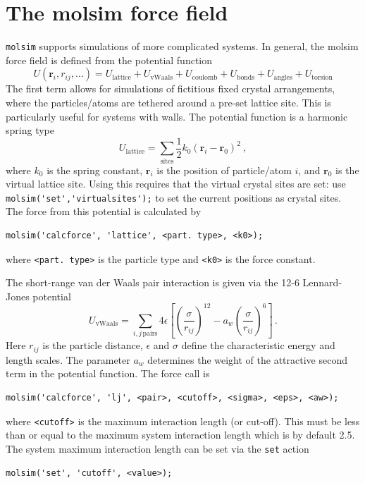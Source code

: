 \documentclass[11pt]{article}
\begin{document}
\section{The \textsf{molsim} force field}
\verb!molsim! supports simulations of more complicated systems. In general, the
\textsf{molsim} force field is defined from the potential function
\begin{equation}
  U(\mathbf{r}_i, r_{ij}, \ldots)
  =  U_\mathrm{lattice} + U_\mathrm{vWaals} + U_{\mathrm{coulomb}} +
  U_\mathrm{bonds} + U_\mathrm{angles} + 
  U_\mathrm{torsion}
\end{equation}
The first term allows for simulations of fictitious fixed crystal arrangements,
where the particles/atoms are tethered around a pre-set lattice site. This is
particularly useful for systems with walls. The potential function is a harmonic
spring type
\begin{equation}
  U_\mathrm{lattice} =
  \sum_\mathrm{sites} \frac{1}{2}k_0 (\mathbf{r}_i - \mathbf{r}_0)^2 \ ,
\end{equation}
where $k_0$ is the spring constant, $\mathbf{r}_i$ is the position of
particle/atom $i$, and $\mathbf{r}_0$ is the virtual lattice site. Using this
requires that the virtual crystal sites are set: use
\verb!molsim('set','virtualsites');! to set the current positions as crystal
sites. The force from this potential is calculated by
\begin{verbatim}
molsim('calcforce', 'lattice', <part. type>, <k0>);
\end{verbatim}
where \verb!<part. type>! is the particle type and \verb!<k0>! is the force
constant. 

The short-range van der Waals pair interaction is given via the 12-6 
Lennard-Jones potential
\begin{equation}
  U_\mathrm{vWaals} =  \sum_{i,j \, \mathrm{pairs}}
  4\epsilon\left[\left(\frac{\sigma}{r_{ij}}\right)^{12} - a_w
    \left(\frac{\sigma}{r_{ij}}\right)^{6}\right] \, .
\end{equation}
Here $r_{ij}$ is the particle distance, $\epsilon$ and $\sigma$ define the
characteristic energy and length scales. The parameter $a_w$ determines the
weight of the attractive second term in the potential function. The force call
is
\begin{verbatim}
molsim('calcforce', 'lj', <pair>, <cutoff>, <sigma>, <eps>, <aw>);
\end{verbatim}
where \verb!<cutoff>! is the maximum interaction length (or cut-off). This must
be less than or equal to the maximum system interaction length which is by
default 2.5. The system maximum interaction length can be set via the
\verb!set! action
\begin{verbatim}
molsim('set', 'cutoff', <value>);
\end{verbatim}
\end{document}
